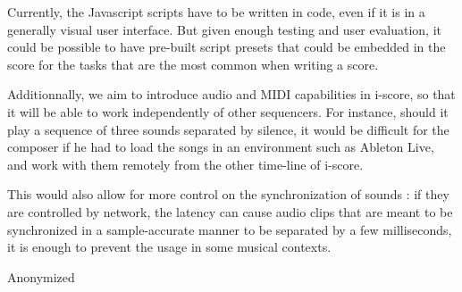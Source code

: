 \documentclass{article}
\begin{document}
Currently, the Javascript scripts have to be written in code, even if it 
is in a generally visual user interface. 
But given enough testing and user evaluation, it could be possible to have pre-built script presets 
that could be embedded in the score for the tasks that are the most common when writing a score.

Additionnally, we aim to introduce audio and MIDI capabilities in i-score, so that 
it will be able to work independently of other sequencers.
For instance, should it play a sequence of three sounds separated by silence, 
it would be difficult for the composer if he had to load 
the songs in an environment such as Ableton Live, and work with them remotely from the other time-line of i-score.

This would also allow for more control on the synchronization of sounds : if they are controlled by network, 
the latency can cause audio clips that are meant to be synchronized in a sample-accurate manner to be separated by a few milliseconds, it is enough to prevent the usage in some musical contexts.

\begin{acknowledgments}
    Anonymized %
\end{acknowledgments} 


\end{document}
